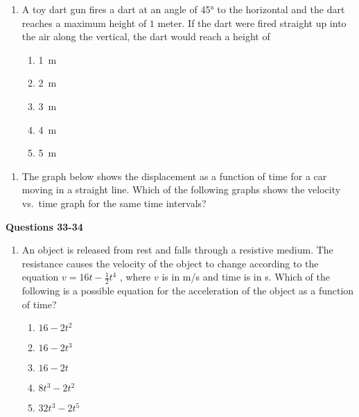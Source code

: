 \documentclass{../../oss-apphys}
\begin{document}
\begin{multicols}{2}
\begin{enumerate}[resume,leftmargin=18pt]
    \item A toy dart gun fires a dart at an angle of \ang{45} to the horizontal
      and the dart reaches a maximum height of $1$ meter. If the dart were fired
      straight up into the air along the vertical, the dart would reach a height
      of
      \begin{enumerate}[noitemsep,topsep=0pt,leftmargin=18pt,label=(\Alph*)]
      \item\SI{1}{\metre}
      \item\SI{2}{\metre}
      \item\SI{3}{\metre}
      \item\SI{4}{\metre}
      \item\SI{5}{\metre}
      \end{enumerate}
  \end{enumerate}
  
  \begin{enumerate}[resume,leftmargin=18pt]
    \columnbreak
    
  \item The graph below shows the displacement as a function of time for a
    car moving in a straight line. Which of the following graphs shows the
    velocity vs.\ time graph for the same time intervals?
    \begin{center}
    \end{center}
  \end{enumerate}
  \columnbreak
  
  \textbf{Questions 33-34}
  
  \begin{enumerate}[resume,leftmargin=18pt]
  \item An object is released from rest and falls through a resistive medium.
    The resistance causes the velocity of the object to change according to the
    equation $v=16t-\frac{1}{2}t^4$ , where $v$ is in \si{m/s} and time is in
    \si{\second}. Which of the following is a possible equation for the acceleration
    of the object as a function of time?
    \begin{enumerate}[noitemsep,topsep=0pt,leftmargin=18pt,label=(\Alph*)]
    \item $16-2t^2$
    \item $16-2t^3$
    \item $16-2t$
    \item $8t^3-2t^2$
    \item $32t^3-2t^5$
    \end{enumerate}
    

\end{enumerate}
\end{multicols}
\end{document}
